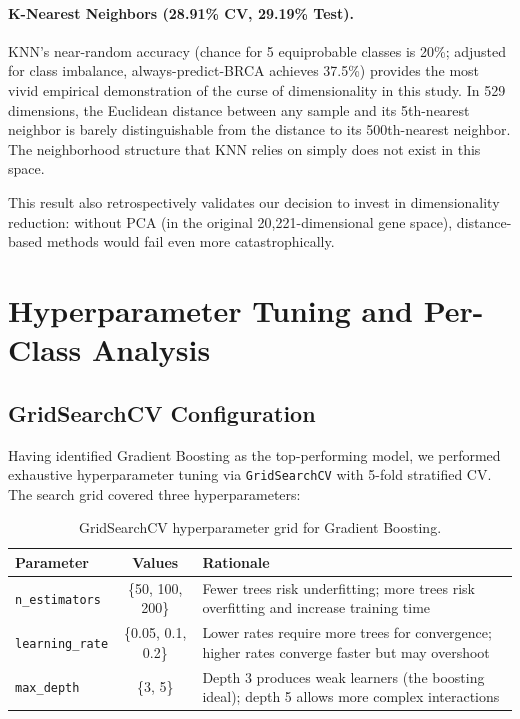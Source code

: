 \documentclass{article}
\begin{document}
\paragraph{K-Nearest Neighbors (28.91\% CV, 29.19\% Test).}
KNN's near-random accuracy (chance for 5 equiprobable classes is 20\%; adjusted for class imbalance, always-predict-BRCA achieves 37.5\%) provides the most vivid empirical demonstration of the curse of dimensionality in this study. In 529 dimensions, the Euclidean distance between any sample and its 5th-nearest neighbor is barely distinguishable from the distance to its 500th-nearest neighbor. The neighborhood structure that KNN relies on simply does not exist in this space.

This result also retrospectively validates our decision to invest in dimensionality reduction: without PCA (in the original 20{,}221-dimensional gene space), distance-based methods would fail even more catastrophically.

\section{Hyperparameter Tuning and Per-Class Analysis}

\subsection{GridSearchCV Configuration}
Having identified Gradient Boosting as the top-performing model, we performed exhaustive hyperparameter tuning via \texttt{GridSearchCV} with 5-fold stratified CV. The search grid covered three hyperparameters:

\begin{table}[H]
\caption{GridSearchCV hyperparameter grid for Gradient Boosting.}
\label{tab:grid}
\begin{center}
\begin{tabular}{lcp{7cm}}
\toprule
\textbf{Parameter} & \textbf{Values} & \textbf{Rationale}\\
\midrule
\texttt{n\_estimators} & \{50, 100, 200\} & Fewer trees risk underfitting; more trees risk overfitting and increase training time\\
\texttt{learning\_rate} & \{0.05, 0.1, 0.2\} & Lower rates require more trees for convergence; higher rates converge faster but may overshoot\\
\texttt{max\_depth} & \{3, 5\} & Depth 3 produces weak learners (the boosting ideal); depth 5 allows more complex interactions\\
\bottomrule
\end{tabular}
\end{center}
\end{table}
\end{document}
